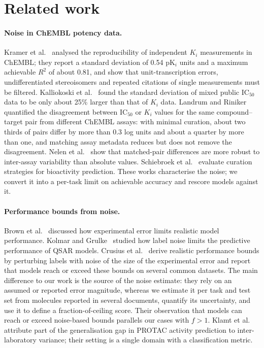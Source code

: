 \section{Related work}
\paragraph{Noise in ChEMBL potency data.}
Kramer et al.~\cite{kramer2012experimental} analysed the reproducibility of independent $K_i$ measurements in ChEMBL; they report a standard deviation of 0.54 pK$_i$ units and a maximum achievable $R^2$ of about 0.81, and show that unit-transcription errors, undifferentiated stereoisomers and repeated citations of single measurements must be filtered. Kalliokoski et al.~\cite{kalliokoski2013comparability} found the standard deviation of mixed public $\mathrm{IC}_{50}$ data to be only about 25\% larger than that of $K_i$ data. Landrum and Riniker~\cite{landrum2024combining} quantified the disagreement between $\mathrm{IC}_{50}$ or $K_i$ values for the same compound--target pair from different ChEMBL assays: with minimal curation, about two thirds of pairs differ by more than 0.3 log units and about a quarter by more than one, and matching assay metadata reduces but does not remove the disagreement. Nelen et al.~\cite{nelen2025matched} show that matched-pair differences are more robust to inter-assay variability than absolute values. Schiebroek et al.~\cite{schiebroek2026balancing} evaluate curation strategies for bioactivity prediction. These works characterise the noise; we convert it into a per-task limit on achievable accuracy and rescore models against it.

\paragraph{Performance bounds from noise.}
Brown et al.~\cite{brown2009healthy} discussed how experimental error limits realistic model performance. Kolmar and Grulke~\cite{kolmar2021noise} studied how label noise limits the predictive performance of QSAR models. Crusius et al.~\cite{crusius2025fitting} derive realistic performance bounds by perturbing labels with noise of the size of the experimental error and report that models reach or exceed these bounds on several common datasets. The main difference to our work is the source of the noise estimate: they rely on an assumed or reported error magnitude, whereas we estimate it per task and test set from molecules reported in several documents, quantify its uncertainty, and use it to define a fraction-of-ceiling score. Their observation that models can reach or exceed noise-based bounds parallels our cases with $f>1$. Klamt et al.~\cite{klamt2026protac} attribute part of the generalisation gap in PROTAC activity prediction to inter-laboratory variance; their setting is a single domain with a classification metric.

